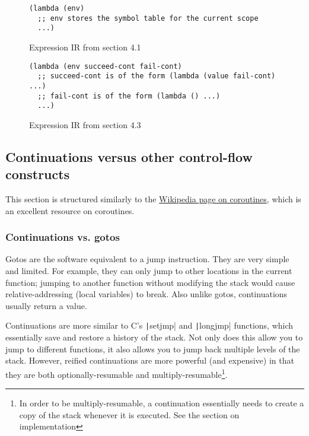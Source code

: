 \documentclass[]{article}
\begin{document}
\begin{figure}[]
  \centering
\begin{verbatim}
(lambda (env)
  ;; env stores the symbol table for the current scope
  ...)
\end{verbatim}
  \caption{Expression IR from section 4.1}
  \label{fig:ir41}
\end{figure}

\begin{figure}[]
  \centering
\begin{verbatim}
(lambda (env succeed-cont fail-cont)
  ;; succeed-cont is of the form (lambda (value fail-cont) ...)
  ;; fail-cont is of the form (lambda () ...)
  ...)
\end{verbatim}
  \caption{Expression IR from section 4.3}
  \label{fig:ir43}
\end{figure}

\subsection{Continuations versus other control-flow constructs}
\label{sec:cntf}

This section is structured similarly to the \href{https://en.wikipedia.org/wiki/Coroutine}{Wikipedia page on coroutines}, which is an excellent resource on coroutines.

\subsubsection{Continuations vs. gotos}
\label{sec:goto}

Gotos are the software equivalent to a jump instruction. They are very simple and limited. For example, they can only jump to other locations in the current function; jumping to another function without modifying the stack would cause relative-addressing (local variables) to break. Also unlike gotos, continuations usually return a value.

Continuations are more similar to C's \texttt|setjmp| and \texttt|longjmp| functions, which essentially save and restore a history of the stack. Not only does this allow you to jump to different functions, it also allows you to jump back multiple levels of the stack. However, reified continuations are more powerful (and expensive) in that they are both optionally-resumable and multiply-resumable\footnote{In order to be multiply-resumable, a continuation essentially needs to create a copy of the stack whenever it is executed. See the section on implementation}.
\end{document}
